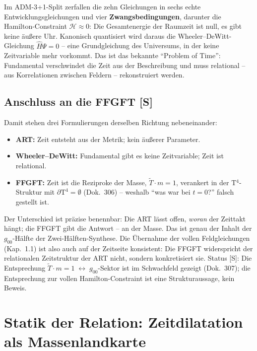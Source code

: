 \documentclass[11pt]{report}
\begin{document}
Im ADM-3+1-Split zerfallen die zehn Gleichungen in sechs echte
Entwicklungsgleichungen und vier \textbf{Zwangsbedingungen},
darunter die Hamilton-Constraint $\mathcal{H} \approx 0$: Die
Gesamtenergie der Raumzeit ist null, es gibt keine äußere Uhr.
Kanonisch quantisiert wird daraus die Wheeler--DeWitt-Gleichung
$\hat{H}\Psi = 0$ -- eine Grundgleichung des Universums, in der
keine Zeitvariable mehr vorkommt. Das ist das bekannte
\enquote{Problem of Time}: Fundamental verschwindet die Zeit aus
der Beschreibung und muss relational -- aus Korrelationen zwischen
Feldern -- rekonstruiert werden.

\section{Anschluss an die FFGFT [S]}

Damit stehen drei Formulierungen derselben Richtung nebeneinander:

\begin{itemize}
  \item \textbf{ART:} Zeit entsteht aus der Metrik; kein äußerer
        Parameter.
  \item \textbf{Wheeler--DeWitt:} Fundamental gibt es keine
        Zeitvariable; Zeit ist relational.
  \item \textbf{FFGFT:} Zeit ist die Reziproke der Masse,
        $\tilde T \cdot m = 1$, verankert in der T$^4$-Struktur mit
        $\partial\text{T}^4 = \emptyset$ (Dok.~306) -- weshalb
        \enquote{was war bei $t=0$?} falsch gestellt ist.
\end{itemize}

Der Unterschied ist präzise benennbar: Die ART lässt offen,
\emph{woran} der Zeittakt hängt; die FFGFT gibt die Antwort -- an
der Masse. Das ist genau der Inhalt der $g_{00}$-Hälfte der
Zwei-Hälften-Synthese. Die Übernahme der vollen Feldgleichungen
(Kap.~1.1) ist also auch auf der Zeitseite konsistent: Die FFGFT
widerspricht der relationalen Zeitstruktur der ART nicht, sondern
konkretisiert sie. Status [S]: Die Entsprechung
$\tilde T \cdot m = 1 \;\leftrightarrow\; g_{00}$-Sektor ist im
Schwachfeld gezeigt (Dok.~307); die Entsprechung zur vollen
Hamilton-Constraint ist eine Strukturaussage, kein Beweis.

\chapter{Statik der Relation: Zeitdilatation als Massenlandkarte}
\end{document}
